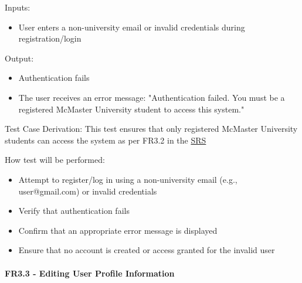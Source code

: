 \documentclass[12pt, titlepage]{article}
\begin{document}
\begin{enumerate}
    Inputs: 
    \begin{itemize}
        \item User enters a non-university email or invalid credentials during registration/login
    \end{itemize}
    
    Output: 
    \begin{itemize}
        \item Authentication fails
        \item The user receives an error message: "Authentication failed. You must be a registered McMaster University student to access this system."
    \end{itemize}
    
    Test Case Derivation: This test ensures that only registered McMaster University students can access the system as per FR3.2 in the \href{https://shorturl.at/FdAgR}{SRS}
    
    How test will be performed:
    \begin{itemize}
        \item Attempt to register/log in using a non-university email (e.g., user@gmail.com) or invalid credentials
        \item Verify that authentication fails
        \item Confirm that an appropriate error message is displayed
        \item Ensure that no account is created or access granted for the invalid user
    \end{itemize}
\end{enumerate}

\paragraph{FR3.3 - Editing User Profile Information}
\end{document}
